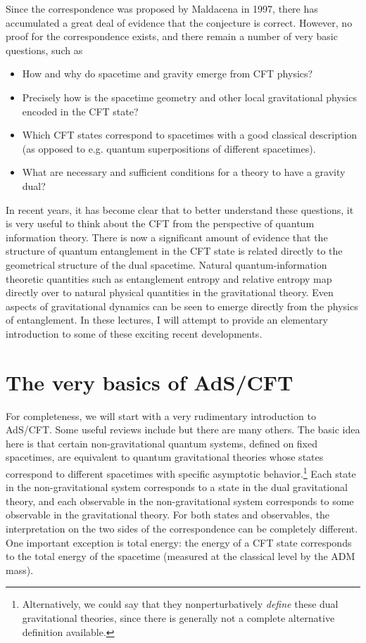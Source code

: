 \documentclass[12pt,epsf]{article}
\begin{document}
Since the correspondence was proposed by Maldacena in 1997, there has accumulated a great deal of evidence that the conjecture is correct. However, no proof for the correspondence exists, and there remain a number of very basic questions, such as
\begin{itemize}
\item
How and why do spacetime and gravity emerge from CFT physics?
\item
Precisely how is the spacetime geometry and other local gravitational physics encoded in the CFT state?
\item
Which CFT states correspond to spacetimes with a good classical description (as opposed to e.g. quantum superpositions of different spacetimes).
\item
What are necessary and sufficient conditions for a theory to have a gravity dual?
\end{itemize}
In recent years, it has become clear that to better understand these questions, it is very useful to think about the CFT from the perspective of quantum information theory. There is now a significant amount of evidence that the structure of quantum entanglement in the CFT state is related directly to the geometrical structure of the dual spacetime. Natural quantum-information theoretic quantities such as entanglement entropy and relative entropy map directly over to natural physical quantities in the gravitational theory. Even aspects of gravitational dynamics can be seen to emerge directly from the physics of entanglement. In these lectures, I will attempt to provide an elementary introduction to some of these exciting recent developments.

\section{The very basics of AdS/CFT}

For completeness, we will start with a very rudimentary introduction to AdS/CFT. Some useful reviews include \cite{aharony2000large, McGreevy:2009xe} but there are many others. The basic idea here is that certain non-gravitational quantum systems, defined on fixed spacetimes, are equivalent to quantum gravitational theories whose states correspond to different spacetimes with specific asymptotic behavior.\footnote{Alternatively, we could say that they nonperturbatively {\it define} these dual gravitational theories, since there is generally not a complete alternative definition available.} Each state in the non-gravitational system corresponds to a state in the dual gravitational theory, and each observable in the non-gravitational system corresponds to some observable in the gravitational theory. For both states and observables, the interpretation on the two sides of the correspondence can be completely different. One important exception is total energy: the energy of a CFT state corresponds to the total energy of the spacetime (measured at the classical level by the ADM mass).
\end{document}
